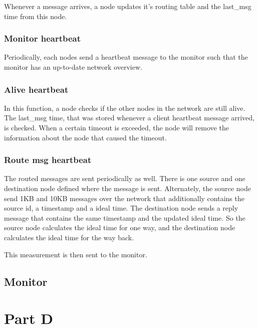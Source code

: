 \documentclass[paper=a4, fontsize=11pt]{scrartcl} %
\numberwithin{equation}{section} %
\numberwithin{figure}{section} %
\numberwithin{table}{section} %
\begin{document}
Whenever a message arrives, a node updates it's routing table and the last\_msg time from this node.

\subsubsection{Monitor heartbeat}
Periodically, each nodes send a heartbeat message to the monitor such that the monitor has an up-to-date network overview.

\subsubsection{Alive heartbeat}
In this function, a node checks if the other nodes in the network are still alive. The last\_msg time, that was stored whenever a client heartbeat message arrived, is checked. When a certain timeout is exceeded, the node will remove the information about the node that caused the timeout. 

\subsubsection{Route msg heartbeat}
The routed messages are sent periodically as well. There is one source and one destination node defined where the message is sent. Alternately, the source node send 1KB and 10KB messages over the network that additionally contains the source id, a timestamp and a ideal time. The destination node sends a reply message that contains the same timestamp and the updated ideal time. So the source node calculates the ideal time for one way, and the destination node calculates the ideal time for the way back.

This measurement is then sent to the monitor.

\subsection{Monitor}

\section{Part D}

\end{document}
